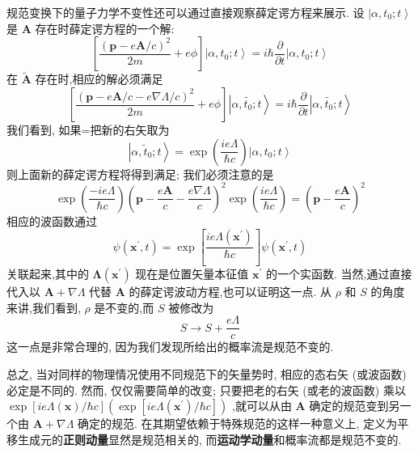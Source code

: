 \documentclass[lang=cn,newtx,10pt,scheme=chinese,thmcnt=section]{elegantbook}
\begin{document}
规范变换下的量子力学不变性还可以通过直接观察薛定谔方程来展示. 设 $\left| {\alpha ,{t}_{0};t}\right\rangle$ 是 $\mathbf{A}$ 存在时薛定谔方程的一个解:
\begin{equation}
	\left\lbrack {\frac{{\left( \mathbf{p} - e\mathbf{A}/c\right) }^{2}}{2m} + {e\phi }}\right\rbrack \left| {\alpha ,{t}_{0};t}\right\rangle = i\hbar \frac{\partial }{\partial t}\left| {\alpha ,{t}_{0};t}\right\rangle
\end{equation}
在 $\widetilde{\mathbf{A}}$ 存在时,相应的解必须满足
\begin{equation}
	\left\lbrack {\frac{{\left( \mathbf{p} - e\mathbf{A}/c - e\nabla \Lambda /c\right) }^{2}}{2m} + {e\phi }}\right\rbrack \left| {\alpha ,\widetilde{{t}_{0}};t}\right\rangle = i\hbar \frac{\partial }{\partial t}\left| {\alpha ,\widetilde{{t}_{0}};t}\right\rangle
\end{equation}
我们看到, 如果=把新的右矢取为
\begin{equation}
	\left| {\alpha ,{\widetilde{t}}_{0};t}\right\rangle = \exp \left( \frac{ie\Lambda }{\hbar c}\right) \left| {\alpha ,{t}_{0};t}\right\rangle
\end{equation}
则上面新的薛定谔方程将得到满足; 我们必须注意的是
\begin{equation}
	\exp \left( \frac{-{ie\Lambda }}{\hbar c}\right) {\left( \mathbf{p} - \frac{e\mathbf{A}}{c} - \frac{e\nabla \Lambda }{c}\right) }^{2}\exp \left( \frac{ie\Lambda }{\hbar c}\right) = {\left( \mathbf{p} - \frac{e\mathbf{A}}{c}\right) }^{2}
\end{equation}
相应的波函数通过
\begin{equation}
	\psi \left( {{\mathbf{x}}^{\prime }, t}\right) = \exp \left\lbrack \frac{{ie\Lambda }\left( {\mathbf{x}}^{\prime }\right) }{\hbar c}\right\rbrack \psi \left( {{\mathbf{x}}^{\prime }, t}\right)
\end{equation}
关联起来,其中的 $\mathbf{\Lambda }\left( {\mathbf{x}}^{\prime }\right)$ 现在是位置矢量本征值 ${\mathbf{x}}^{\prime }$ 的一个实函数. 当然,通过直接代入以 $\mathbf{A} + \nabla \Lambda$ 代替 $\mathbf{A}$ 的薛定谔波动方程,也可以证明这一点. 从 $\rho$ 和 $S$ 的角度来讲,我们看到, $\rho$ 是不变的,而 $S$ 被修改为
\begin{equation}
	S \rightarrow S + \frac{e\Lambda }{c}
\end{equation}
这一点是非常合理的, 因为我们发现所给出的概率流是规范不变的.

总之, 当对同样的物理情况使用不同规范下的矢量势时, 相应的态右矢 (或波函数) 必定是不同的. 然而, 仅仅需要简单的改变; 只要把老的右矢 (或老的波函数) 乘以 $\exp \left\lbrack {{ie\Lambda }\left( \mathbf{x}\right) /\hbar c}\right\rbrack \left( {\exp \left\lbrack {{ie\Lambda }\left( {\mathbf{x}}^{\prime }\right) /\hbar c}\right\rbrack }\right)$ ,就可以从由 $\mathbf{A}$ 确定的规范变到另一个由 $\mathbf{A} + \nabla \Lambda$ 确定的规范. 在其期望依赖于特殊规范的这样一种意义上, 定义为平移生成元的\textbf{正则动量}显然是规范相关的, 而\textbf{运动学动量}和概率流都是规范不变的.
\end{document}
